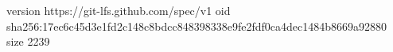 version https://git-lfs.github.com/spec/v1
oid sha256:17ec6c45d3e1fd2c148c8bdcc848398338e9fe2fdf0ca4dec1484b8669a92880
size 2239
